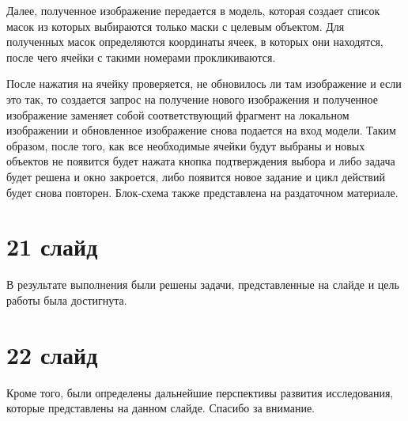 \documentclass{altsu-report}
\begin{document}
Далее, полученное изображение передается в модель, которая создает список масок 
из которых выбираются только маски с целевым объектом. Для полученных масок 
определяются координаты ячеек, в которых они находятся, после чего ячейки с 
такими номерами прокликиваются.

После нажатия на ячейку проверяется, не обновилось ли там изображение и если это 
так, то создается запрос на получение нового изображения и полученное изображение 
заменяет собой соответствующий фрагмент на локальном изображении и обновленное 
изображение снова подается на вход модели. Таким образом, после того, как все 
необходимые ячейки будут выбраны и новых объектов не появится будет нажата кнопка 
подтверждения выбора и либо задача будет решена и окно закроется, либо появится 
новое задание и цикл действий будет снова повторен. Блок-схема также представлена 
на раздаточном материале.

\section*{21 слайд}

В результате выполнения были решены задачи, представленные на слайде и цель 
работы была достигнута.

\section*{22 слайд}

Кроме того, были определены дальнейшие перспективы развития исследования, которые 
представлены на данном слайде. Спасибо за внимание.
\end{document}
